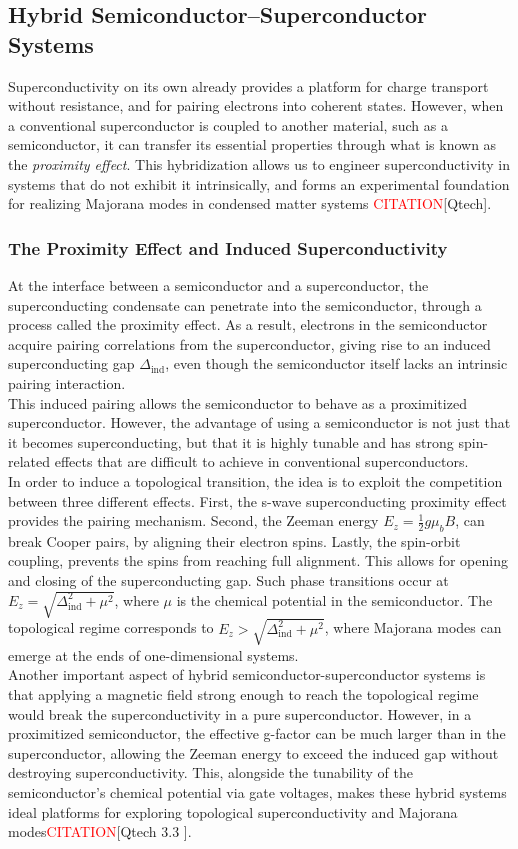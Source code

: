 \documentclass[11pt, letterpaper, titlepage]{article}
\begin{document}
\subsection{Hybrid Semiconductor–Superconductor Systems}
Superconductivity on its own already provides a platform for charge transport without resistance, and for pairing electrons into coherent states. However, when a conventional superconductor is coupled to another material, such as a semiconductor, it can transfer its essential properties through what is known as the \textit{proximity effect}. This hybridization allows us to engineer superconductivity in systems that do not exhibit it intrinsically, and forms an experimental foundation for realizing Majorana modes in condensed matter systems \textcolor{red}{CITATION}[Qtech].
\subsubsection{The Proximity Effect and Induced Superconductivity}
At the interface between a semiconductor and a superconductor, the superconducting condensate can penetrate into the semiconductor, through a process called the proximity effect. As a result, electrons in the semiconductor acquire pairing correlations from the superconductor, giving rise to an induced superconducting gap $Δ_{\mathrm{ind}}$, even though the semiconductor itself lacks an intrinsic pairing interaction.\\
This induced pairing allows the semiconductor to behave as a proximitized superconductor. However, the advantage of using a semiconductor is not just that it becomes superconducting, but that it is highly tunable and has strong spin-related effects that are difficult to achieve in conventional superconductors.\\
In order to induce a topological transition, the idea is to exploit the competition between three different effects. First, the s-wave superconducting proximity effect provides the pairing mechanism. Second, the Zeeman energy $E_z = \frac{1}{2} g μ_bB$, can break Cooper pairs, by aligning their electron spins. Lastly, the spin-orbit coupling, prevents the spins from reaching full alignment. This allows for opening and closing of the superconducting gap. Such phase transitions occur at $E_z = \sqrt{Δ_{\mathrm{ind}}^2 + μ^2}$, where $μ$ is the chemical potential in the semiconductor. The topological regime corresponds to $E_z > \sqrt{Δ_{\mathrm{ind}}^2 + μ^2}$, where Majorana modes can emerge at the ends of one-dimensional systems.\\
Another important aspect of hybrid semiconductor-superconductor systems is that applying a magnetic field strong enough to reach the topological regime would break the superconductivity in a pure superconductor. However, in a proximitized semiconductor, the effective g-factor can be much larger than in the superconductor, allowing the Zeeman energy to exceed the induced gap without destroying superconductivity. This, alongside the tunability of the semiconductor's chemical potential via gate voltages, makes these hybrid systems ideal platforms for exploring topological superconductivity and Majorana modes\textcolor{red}{CITATION}[Qtech 3.3 ].\\
\end{document}
